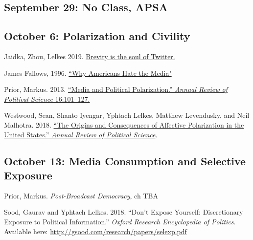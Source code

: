\vspace{-.1in}\documentclass[11pt]{article}
\begin{document}
\subsection*{September 29: No Class, APSA}

\subsection*{October 6: Polarization and Civility}


Jaidka, Zhou, Lelkes 2019.  \href{https://github.com/kmunger/MSMP21/blob/main/yph.pdf}{Brevity is the soul of Twitter. }



\noindent James Fallows, 1996. \href{https://www.theatlantic.com/magazine/archive/1996/02/why-americans-hate-the-media/305060/}{``Why Americans Hate the Media"}


\noindent Prior, Markus. 2013. \href{https://github.com/kmunger/MSMP21/blob/main/prior.pdf}{``Media and Political Polarization.'' \emph{Annual Review of Political Science} 16:101--127.}

\noindent Westwood, Sean, Shanto Iyengar, Yphtach Lelkes, Matthew Levendusky, and Neil Malhotra. 2018. \href{https://github.com/kmunger/MSMP21/blob/main/prior.pdf}{ ``The Origins and Consequences of Affective Polarization in the United States.'' \emph{Annual Review of Political Science}}.










\subsection*{October 13: Media Consumption and Selective Exposure}



Prior, Markus. \textit{Post-Broadcast Democracy}, ch TBA


\noindent Sood, Gaurav and Yphtach Lelkes. 2018. ``Don't Expose Yourself: Discretionary Exposure to Political Information.'' \emph{Oxford Research Encyclopedia of Politics}. Available here: \url{http://gsood.com/research/papers/selexp.pdf}
\end{document}
